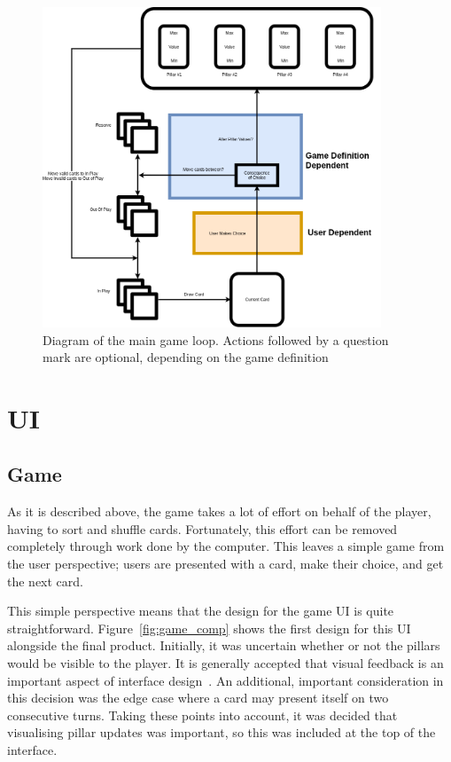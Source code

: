 \begin{figure}[!h]
	\centering
	\includegraphics[width=0.9\textwidth]{./images/design/diag.png}
	\caption{Diagram of the main game loop. Actions followed by a question mark are optional, depending on the game definition}
	\label{fig:diag}
\end{figure}

\section{UI}

\subsection{Game}
As it is described above, the game takes a lot of effort on behalf of the player, having to sort and shuffle cards. Fortunately, this effort can be removed completely through work done by the computer. This leaves a simple game from the user perspective; users are presented with a card, make their choice, and get the next card.

This simple perspective means that the design for the game UI is quite straightforward. Figure~\ref{fig:game_comp} shows the first design for this UI alongside the final product. Initially, it was uncertain whether or not the pillars would be visible to the player. It is generally accepted that visual feedback is an important aspect of interface design~\cite{fb}. An additional, important consideration in this decision was the  edge case where a card may present itself on two consecutive turns. Taking these points into account, it was decided that visualising pillar updates was important, so this was included at the top of the interface.

